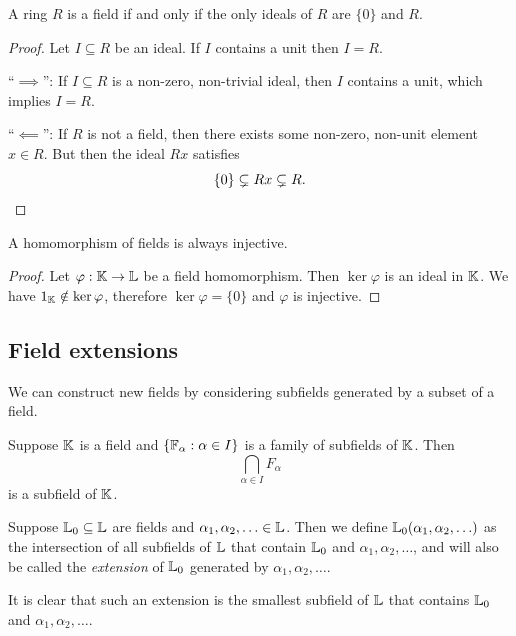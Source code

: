 \begin{lemma}
    A ring $R$ is a field if and only if the only ideals of $R$ are $\{0\}$ and $R$.
\end{lemma}

\begin{proof}
    Let $I \subseteq R$ be an ideal. If $I$ contains a unit then $I = R$.

    ``$\implies$'': If $I \subseteq R$ is a non-zero, non-trivial ideal, then $I$ contains a unit, which implies $I = R$.

    ``$\impliedby$'': If $R$ is not a field, then there exists some non-zero, non-unit element $x \in R$. But then the ideal $Rx$ satisfies
    \[
        \{ 0 \} \subsetneq Rx \subsetneq R. \qedhere
    \]
\end{proof}

\begin{corollary}
    A homomorphism of fields is always injective.
\end{corollary}

\begin{proof}
    Let $\varphi : \mathbb{K} \to \mathbb{L}$ be a field homomorphism. Then $\ker \varphi$ is an ideal in $\mathbb{K}$. We have $1_{\mathbb{K}} \notin \ker \varphi$, therefore $\ker \varphi = \{ 0 \}$ and $\varphi$ is injective.
\end{proof}

\subsection{Field extensions}

We can construct new fields by considering subfields generated by a subset of a field.

\begin{lemma}
    Suppose $\mathbb{K}$ is a field and $\{ \mathbb{F}_\alpha : \alpha \in I \}$ is a family of subfields of $\mathbb{K}$. Then
    \[
        \bigcap_{\alpha \in I} F_\alpha
    \]
    is a subfield of $\mathbb{K}$.
\end{lemma}

\begin{definition}
    Suppose $\mathbb{L}_0 \subseteq \mathbb{L}$ are fields and $\alpha_1, \alpha_2, \ldots \in \mathbb{L}$. Then we define $\mathbb{L}_0(\alpha_1, \alpha_2, \ldots)$ as the intersection of all subfields of $\mathbb{L}$ that contain $\mathbb{L}_0$ and $\alpha_1, \alpha_2, \ldots$, and will also be called the \emph{extension} of $\mathbb{L}_0$ generated by $\alpha_1, \alpha_2, \ldots$.
\end{definition}

It is clear that such an extension is the smallest subfield of $\mathbb{L}$ that contains $\mathbb{L}_0$ and $\alpha_1, \alpha_2, \ldots$.

